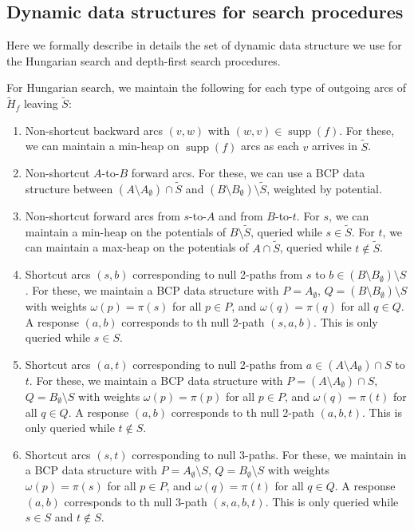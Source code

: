 \documentclass[a4paper,UKenglish]{socg-lipics-v2018}
\def\supp{\operatorname{supp}}
\theoremstyle{plain}
\numberwithin{figure}{section}
\begin{document}
\begin{toappendix}
\subsection{Dynamic data structures for search procedures}
\label{SSA:ds-search}

Here we formally describe in details the set of dynamic data structure we use for the Hungarian search and depth-first search procedures.

For Hungarian search, we maintain the following for each type of outgoing arcs of $\tilde{H}_f$ leaving $\tilde{S}$:
\begin{enumerate}
\item Non-shortcut backward arcs $(v, w)$ with $(w, v) \in \supp(f)$.
	For these, we can maintain a min-heap on $\supp(f)$ arcs as each $v$
	arrives in $\tilde{S}$.
\item Non-shortcut $A$-to-$B$ forward arcs.
	For these, we can use a BCP data structure between
	$(A \setminus A_\emptyset) \cap \tilde{S}$ and
	$(B \setminus B_\emptyset) \setminus \tilde{S}$, weighted by potential.
\item Non-shortcut forward arcs from $s$-to-$A$ and from $B$-to-$t$.
	For $s$, we can maintain a min-heap on the potentials of
	$B \setminus \tilde{S}$, queried while $s \in \tilde{S}$.
	For $t$, we can maintain a max-heap on the potentials of
	$A \cap \tilde{S}$, queried while $t \not\in \tilde{S}$.

\item Shortcut arcs $(s, b)$ corresponding to null 2-paths from $s$ to
	$b \in (B \setminus B_\emptyset) \setminus S$.
	For these, we maintain a BCP data structure with $P = A_\emptyset$,
	$Q = (B \setminus B_\emptyset) \setminus S$ with weights
	$\omega(p) = \pi(s)$ for all $p \in P$, and $\omega(q) = \pi(q)$ for
	all $q \in Q$.
	A response $(a, b)$ corresponds to th null 2-path $(s, a, b)$.
	This is only queried while $s \in S$.
\item Shortcut arcs $(a, t)$ corresponding to null 2-paths from
	$a \in (A \setminus A_\emptyset) \cap S$ to $t$.
	For these, we maintain a BCP data structure with
	$P = (A \setminus A_\emptyset) \cap S$,
	$Q = B_\emptyset \setminus S$ with weights $\omega(p) = \pi(p)$ for
	all $p \in P$, and $\omega(q) = \pi(t)$ for all $q \in Q$.
	A response $(a, b)$ corresponds to th null 2-path $(a, b, t)$.
	This is only queried while $t \not\in S$.
\item Shortcut arcs $(s, t)$ corresponding to null 3-paths.
	For these, we maintain in a BCP data structure with
	$P = A_\emptyset \setminus S$, $Q = B_\emptyset \setminus S$ with
	weights $\omega(p) = \pi(s)$ for all
	$p \in P$, and $\omega(q) = \pi(t)$ for all $q \in Q$.
	A response $(a, b)$ corresponds to th null 3-path $(s, a, b, t)$.
	This is only queried while $s \in S$ and $t \not\in S$.
\end{enumerate}

\end{toappendix}
\end{document}
